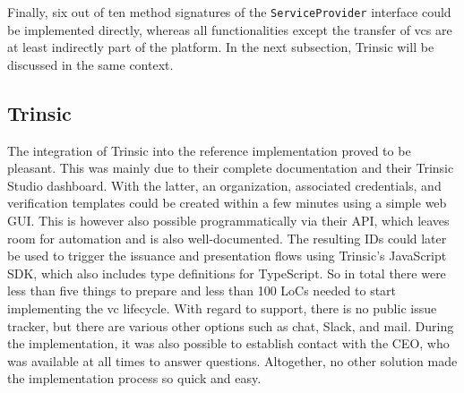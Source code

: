         Finally, six out of ten method signatures of the \texttt{ServiceProvider} interface could be implemented directly, whereas all functionalities except the transfer of \acp{vc} are at least indirectly part of the platform. In the next subsection, Trinsic will be discussed in the same context.
    
        \subsection{Trinsic}\label{subsection: trinsic}
        
            The integration of Trinsic into the reference implementation proved to be pleasant. This was mainly due to their complete documentation and their Trinsic Studio dashboard. With the latter, an organization, associated credentials, and verification templates could be created within a few minutes using a simple web GUI. This is however also possible programmatically via their API, which leaves room for automation and is also well-documented. The resulting IDs could later be used to trigger the issuance and presentation flows using Trinsic's JavaScript SDK, which also includes type definitions for TypeScript. So in total there were less than five things to prepare and less than 100 LoCs needed to start implementing the \ac{vc} lifecycle. With regard to support, there is no public issue tracker, but there are various other options such as chat, Slack, and mail. During the implementation, it was also possible to establish contact with the CEO, who was available at all times to answer questions. Altogether, no other solution made the implementation process so quick and easy.
    
